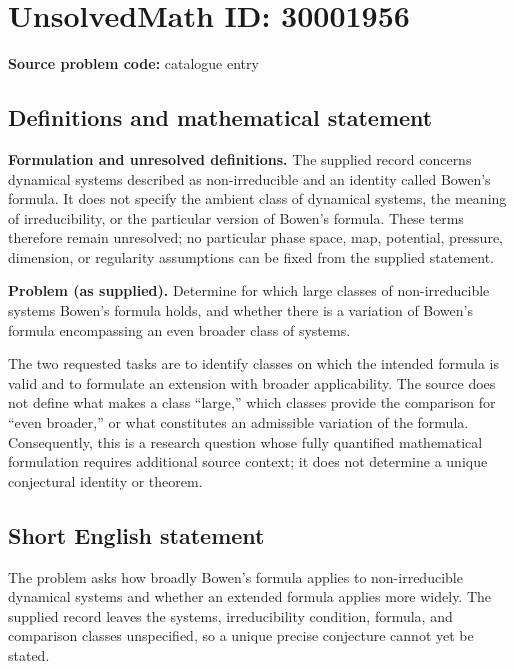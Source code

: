 \documentclass[11pt]{article}
\begin{document}
\section*{UnsolvedMath ID: 30001956}
\textbf{Source problem code:} catalogue entry
\subsection{Definitions and mathematical statement}
\textbf{Formulation and unresolved definitions.} The supplied record concerns dynamical systems described as non-irreducible and an identity called Bowen's formula. It does not specify the ambient class of dynamical systems, the meaning of irreducibility, or the particular version of Bowen's formula. These terms therefore remain unresolved; no particular phase space, map, potential, pressure, dimension, or regularity assumptions can be fixed from the supplied statement.

\textbf{Problem (as supplied).} Determine for which large classes of non-irreducible systems Bowen's formula holds, and whether there is a variation of Bowen's formula encompassing an even broader class of systems.

The two requested tasks are to identify classes on which the intended formula is valid and to formulate an extension with broader applicability. The source does not define what makes a class ``large,'' which classes provide the comparison for ``even broader,'' or what constitutes an admissible variation of the formula. Consequently, this is a research question whose fully quantified mathematical formulation requires additional source context; it does not determine a unique conjectural identity or theorem.
\subsection{Short English statement}
The problem asks how broadly Bowen's formula applies to non-irreducible dynamical systems and whether an extended formula applies more widely. The supplied record leaves the systems, irreducibility condition, formula, and comparison classes unspecified, so a unique precise conjecture cannot yet be stated.
\end{document}
